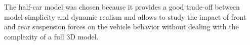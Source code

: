 \documentclass[]{report}
\begin{document}
The half-car model was chosen because it provides a good trade-off between model simplicity and dynamic realism and allows to study the impact of front and rear suspension forces on the vehicle behavior without dealing with the complexity of a full 3D model.

	
	
	
	
\end{document}
